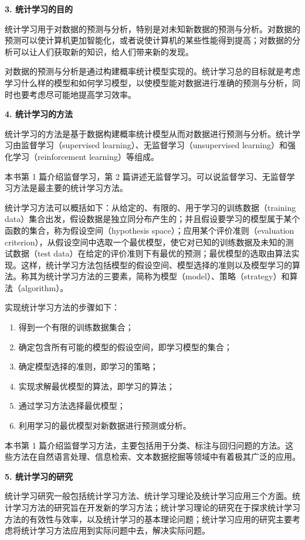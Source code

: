 \documentclass[UTF8,12pt,a4paper,fontset=fandol]{ctexart}
\begin{document}
\noindent\textbf{3. 统计学习的目的}

统计学习用于对数据的预测与分析，特别是对未知新数据的预测与分析。对数据的预测可以使计算机更加智能化，或者说使计算机的某些性能得到提高；对数据的分析可以让人们获取新的知识，给人们带来新的发现。

对数据的预测与分析是通过构建概率统计模型实现的。统计学习总的目标就是考虑学习什么样的模型和如何学习模型，以使模型能对数据进行准确的预测与分析，同时也要考虑尽可能地提高学习效率。

\noindent\textbf{4. 统计学习的方法}

统计学习的方法是基于数据构建概率统计模型从而对数据进行预测与分析。统计学习由监督学习（supervised learning）、无监督学习（unsupervised learning）和强化学习（reinforcement learning）等组成。

本书第 1 篇介绍监督学习，第 2 篇讲述无监督学习。可以说监督学习、无监督学习方法是最主要的统计学习方法。

统计学习方法可以概括如下：从给定的、有限的、用于学习的训练数据（training data）集合出发，假设数据是独立同分布产生的；并且假设要学习的模型属于某个函数的集合，称为假设空间（hypothesis space）；应用某个评价准则（evaluation criterion），从假设空间中选取一个最优模型，使它对已知的训练数据及未知的测试数据（test data）在给定的评价准则下有最优的预测；最优模型的选取由算法实现。这样，统计学习方法包括模型的假设空间、模型选择的准则以及模型学习的算法。称其为统计学习方法的三要素，简称为模型（model）、策略（strategy）和算法（algorithm）。

实现统计学习方法的步骤如下：
\begin{enumerate}
  \item 得到一个有限的训练数据集合；
  \item 确定包含所有可能的模型的假设空间，即学习模型的集合；
  \item 确定模型选择的准则，即学习的策略；
  \item 实现求解最优模型的算法，即学习的算法；
  \item 通过学习方法选择最优模型；
  \item 利用学习的最优模型对新数据进行预测或分析。
\end{enumerate}

本书第 1 篇介绍监督学习方法，主要包括用于分类、标注与回归问题的方法。这些方法在自然语言处理、信息检索、文本数据挖掘等领域中有着极其广泛的应用。

\noindent\textbf{5. 统计学习的研究}

统计学习研究一般包括统计学习方法、统计学习理论及统计学习应用三个方面。统计学习方法的研究旨在开发新的学习方法；统计学习理论的研究在于探求统计学习方法的有效性与效率，以及统计学习的基本理论问题；统计学习应用的研究主要考虑将统计学习方法应用到实际问题中去，解决实际问题。
\end{document}
